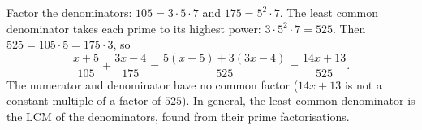 Factor the denominators: $105=3\cdot5\cdot7$ and $175=5^2\cdot7$. The least common denominator takes each prime to its highest power: $3\cdot5^2\cdot7=525$. Then $525=105\cdot5=175\cdot3$, so
\[
\dfrac{x+5}{105}+\dfrac{3x-4}{175}=\dfrac{5(x+5)+3(3x-4)}{525}=\boxed{\dfrac{14x+13}{525}} .
\]
The numerator and denominator have no common factor ($14x+13$ is not a constant multiple of a factor of $525$). In general, the least common denominator is the LCM of the denominators, found from their prime factorisations.
